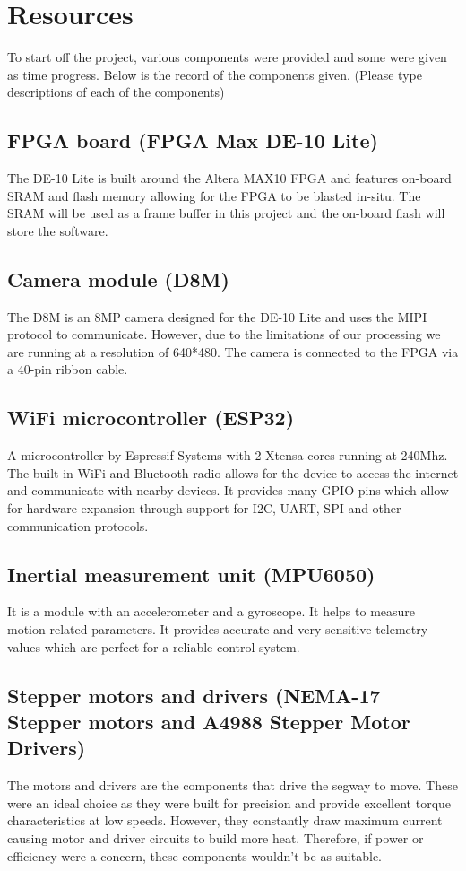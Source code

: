 \section{Resources}
To start off the project, various components were provided and some were given as time progress. Below is the record of the components given. (Please type descriptions of each of the components)

\subsection{FPGA board (FPGA Max DE-10 Lite)}
The DE-10 Lite is built around the Altera MAX10 FPGA and features on-board SRAM and flash memory allowing for the FPGA to be blasted in-situ. The SRAM will be used as a frame buffer in this project and the on-board flash will store the software.

\subsection{Camera module (D8M)}
The D8M is an 8MP camera designed for the DE-10 Lite and uses the MIPI protocol to communicate. However, due to the limitations of our processing we are running at a resolution of 640*480. The camera is connected to the FPGA via a 40-pin ribbon cable.

\subsection{WiFi microcontroller (ESP32)}
A microcontroller by Espressif Systems with 2 Xtensa cores running at 240Mhz. The built in WiFi and Bluetooth radio allows for the device to access the internet and communicate with nearby devices. It provides many GPIO pins which allow for hardware expansion through support for I2C, UART, SPI and other communication protocols.

\subsection{Inertial measurement unit (MPU6050)}
It is a module with an accelerometer and a gyroscope. It helps to measure motion-related parameters. It provides accurate and very sensitive telemetry values which are perfect for a reliable control system.

\subsection{Stepper motors and drivers (NEMA-17 Stepper motors and A4988 Stepper Motor Drivers)}
The motors and drivers are the components that drive the segway to move. These were an ideal choice as they were built for precision and provide excellent torque characteristics at low speeds. However, they constantly draw maximum current causing motor and driver circuits to build more heat. Therefore, if power or efficiency were a concern, these components wouldn’t be as suitable.